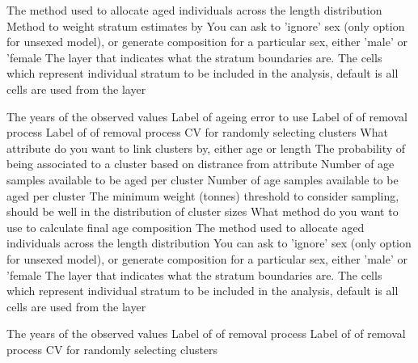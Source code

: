  {The method used to allocate aged individuals across the length distribution}
 {Method to weight stratum estimates by}
 {You can ask to 'ignore' sex (only option for unsexed model), or generate composition for a particular sex, either 'male' or 'female}
 {The layer that indicates what the stratum boundaries are.}
 {The cells which represent individual stratum to be included in the analysis, default is all cells are used from the layer}
\par\textbf{}\par
{} {The years of the observed values}
 {Label of ageing error to use}
 {Label of of removal process}
 {Label of of removal process}
 {CV for randomly selecting clusters}
 {What attribute do you want to link clusters by, either age or length}
 {The probability of being associated to a cluster based on distrance from attribute}
 {Number of age samples available to be aged per cluster}
 {Number of age samples available to be aged per cluster}
 {The minimum weight (tonnes) threshold to consider sampling, should be well in the distribution of cluster sizes}
 {What method do you want to use to calculate final age composition}
 {The method used to allocate aged individuals across the length distribution}
 {You can ask to 'ignore' sex (only option for unsexed model), or generate composition for a particular sex, either 'male' or 'female}
 {The layer that indicates what the stratum boundaries are.}
 {The cells which represent individual stratum to be included in the analysis, default is all cells are used from the layer}
\par\textbf{}\par
{} {The years of the observed values}
 {Label of of removal process}
 {Label of of removal process}
 {CV for randomly selecting clusters}
